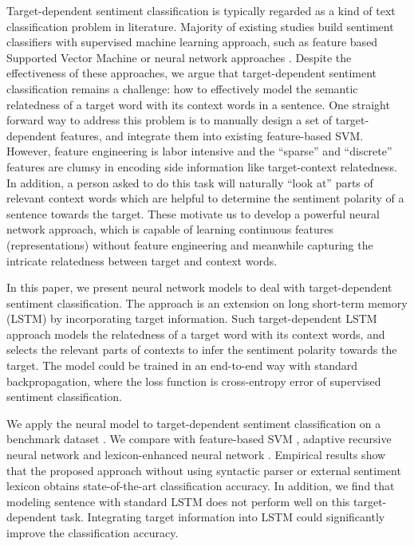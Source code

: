 \documentclass[11pt]{article}
\begin{document}
Target-dependent sentiment classification is typically regarded as a kind of text classification problem in literature.
Majority of existing studies build sentiment classifiers with supervised machine learning approach, such as feature based Supported Vector Machine \cite{Jiang2011} or neural network approaches \cite{Dong2014a,Vo2015}.
Despite the effectiveness of these approaches, we argue that target-dependent sentiment classification remains a challenge: how to effectively model the semantic relatedness of a target word with its context words in a sentence. 
One straight forward way to address this problem is to manually design a set of target-dependent features, and integrate them into existing feature-based SVM. 
However, feature engineering is labor intensive and the ``sparse'' and ``discrete'' features are clumsy in encoding side information like target-context relatedness.
In addition, a person asked to do this task will naturally ``look at'' parts of relevant context words which are helpful to determine the sentiment polarity of a sentence towards the target. 
These motivate us to develop a powerful neural network approach, which is capable of learning continuous features (representations) without feature engineering and meanwhile capturing the intricate relatedness between target and context words.



In this paper, we present neural network models to deal with target-dependent sentiment classification. 
The approach is an extension on long short-term memory (LSTM) \cite{Hochreiter1997} by incorporating target information. 
Such target-dependent LSTM approach models the relatedness of a target word with its context words, and selects the relevant parts of contexts to infer the sentiment polarity towards the target. 
The model could be trained in an end-to-end way with standard backpropagation, where the loss function is cross-entropy error of supervised sentiment classification.


We apply the neural model to target-dependent sentiment classification on a benchmark dataset \cite{Dong2014a}. We compare with feature-based SVM \cite{Jiang2011}, adaptive recursive neural network \cite{Dong2014a} and lexicon-enhanced neural network \cite{Vo2015}.
Empirical results show that the proposed approach without using syntactic parser or external sentiment lexicon obtains state-of-the-art classification accuracy.
In addition, we find that modeling sentence with standard LSTM does not perform well on this target-dependent task.
Integrating target information into LSTM could significantly improve the classification accuracy.
\end{document}

